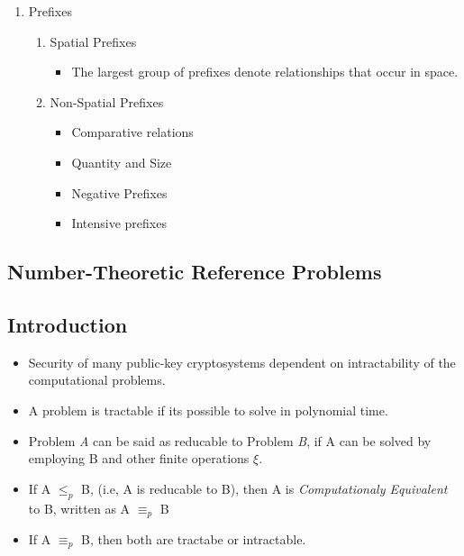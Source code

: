 \documentclass[12pt]{article}
\begin{document}
\begin{enumerate}
\item Prefixes
\begin{enumerate} 
\item Spatial Prefixes
\begin{itemize}
\item The largest group of prefixes denote relationships that occur in space.
\end{itemize}
\item Non-Spatial Prefixes
\begin{itemize}
\item Comparative relations
\item Quantity and Size
\item Negative Prefixes
\item Intensive prefixes
\end{itemize}
\end{enumerate}
\end{enumerate}




%
%

\pagebreak
\vspace*{\fill}
\begin{center}
\section{Number-Theoretic Reference Problems}
\end{center}
\vspace*{\fill}
\pagebreak
\subsection{Introduction}
\begin{itemize}
\item Security of many public-key cryptosystems dependent on intractability of the computational problems.
\item A problem is tractable if its possible to solve in polynomial time.
\item Problem \textit{A} can be said as reducable to Problem \textit{B}, if A can be solved by employing B and other finite operations $\xi.$
\item If A $\leq_{p}$ B, (i.e, A is reducable to B), then A is \textit{Computationaly Equivalent} to B, written as A $\equiv_{p}$ B
\item If  A $\equiv_{p}$ B, then both are tractabe or intractable.
\end{itemize} 
\end{document}
